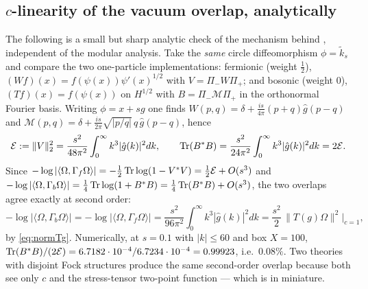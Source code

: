 \subsection{$c$-linearity of the vacuum overlap, analytically}

The following is a small but sharp analytic check of the mechanism behind , independent of
the modular analysis.  Take the \emph{same} circle diffeomorphism $\phi=\tilde k_{s}$ and compare the two
one-particle implementations: fermionic (weight $\frac12$), $(Wf)(x)=f(\psi(x))\psi'(x)^{1/2}$ with
$V=\Pi_{-}W\Pi_{+}$; and bosonic (weight $0$), $(Tf)(x)=f(\psi(x))$ on $H^{1/2}$ with $B=\Pi_{-}\mathcal M\Pi_{+}$ in
the orthonormal Fourier basis.  Writing $\phi=x+sg$ one finds
$W(p,q)=\delta+\frac{is}{4\pi}(p+q)\hat g(p-q)$ and
$\mathcal M(p,q)=\delta+\frac{is}{2\pi}\sqrt{|p/q|}\,q\,\hat g(p-q)$, hence
\[
 \mathcal E:=\|V\|_{2}^{2}=\frac{s^{2}}{48\pi^{2}}\int_{0}^{\infty}k^{3}|\hat g(k)|^{2}dk,
 \qquad
 \operatorname{Tr}(B^{*}B)=\frac{s^{2}}{24\pi^{2}}\int_{0}^{\infty}k^{3}|\hat g(k)|^{2}dk=2\mathcal E .
\]
Since $-\log|\langle\Omega,\Gamma_{f}\Omega\rangle|=-\frac12\operatorname{Tr}\log(1-V^{*}V)=\frac12\mathcal E+O(s^{3})$
and $-\log|\langle\Omega,\Gamma_{b}\Omega\rangle|=\frac14\operatorname{Tr}\log(1+B^{*}B)=\frac14\operatorname{Tr}(B^{*}B)+O(s^{3})$, the
two overlaps agree exactly at second order:
\begin{equation}\label{eq:clin}
 -\log\bigl|\langle\Omega,\Gamma_{b}\Omega\rangle\bigr|
 =-\log\bigl|\langle\Omega,\Gamma_{f}\Omega\rangle\bigr|
 =\frac{s^{2}}{96\pi^{2}}\int_{0}^{\infty}k^{3}|\hat g(k)|^{2}dk
 =\frac{s^{2}}{2}\,\|T(g)\Omega\|^{2}\Big|_{c=1},
\end{equation}
by \eqref{eq:normTg}.  Numerically, at $s=0.1$ with $|k|\le60$ and box $X=100$,
$\operatorname{Tr}(B^{*}B)/(2\mathcal E)=6.7182\cdot10^{-4}/6.7234\cdot10^{-4}=0.99923$, i.e.\ $0.08\%$.  Two theories
with disjoint Fock structures produce the same second-order overlap because both see only $c$ and the
stress-tensor two-point function --- which is  in miniature.
